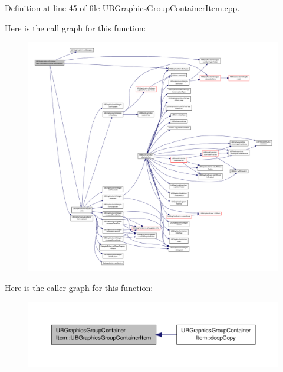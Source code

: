 Definition at line 45 of file U\-B\-Graphics\-Group\-Container\-Item.\-cpp.



Here is the call graph for this function\-:
\nopagebreak
\begin{figure}[H]
\begin{center}
\leavevmode
\includegraphics[width=350pt]{de/d93/class_u_b_graphics_group_container_item_a2aaeb364079830d1720110c30f999ec8_cgraph}
\end{center}
\end{figure}




Here is the caller graph for this function\-:
\nopagebreak
\begin{figure}[H]
\begin{center}
\leavevmode
\includegraphics[width=350pt]{de/d93/class_u_b_graphics_group_container_item_a2aaeb364079830d1720110c30f999ec8_icgraph}
\end{center}
\end{figure}


